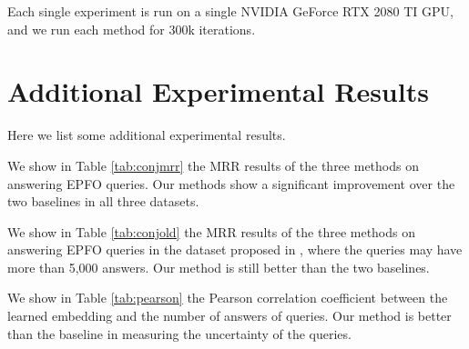 Each single experiment is run on a single NVIDIA GeForce RTX 2080 TI GPU, and we run each method for 300k iterations.

\section{Additional Experimental Results}\label{appendix:results}
Here we list some additional experimental results. 

We show in Table \ref{tab:conjmrr} the MRR results of the three methods on answering EPFO queries.
Our methods show a significant improvement over the two baselines in all three datasets.

We show in Table \ref{tab:conjold} the MRR results of the three methods on answering EPFO queries in the dataset proposed in \cite{ren2020query2box}, where the queries may have more than 5,000 answers. Our method is still better than the two baselines. 

We show in Table \ref{tab:pearson} the Pearson correlation coefficient between the learned embedding and the number of answers of queries. Our method is better than the baseline \qb in measuring the uncertainty of the queries. 




